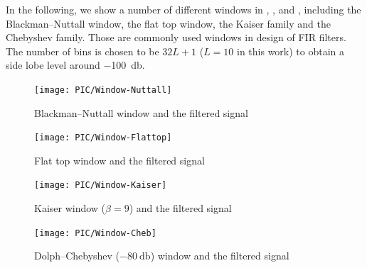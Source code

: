 In the following, we show a number of different windows in , ,  and , including the Blackman--Nuttall window, the flat top window, the Kaiser family and the Chebyshev family. Those are commonly used windows \citep{Oppenheim2010} in design of FIR filters. The number of bins is chosen to be $32L+1$ ($L=10$ in this work) to obtain a side lobe level around \SI{-100}{\decibel}.
\begin{figure}[htb!]
\centering
\texttt{[image: PIC/Window-Nuttall]}
\caption{Blackman--Nuttall window and the filtered signal}\label{fig:nuttall_window}
\end{figure}
\begin{figure}[htb!]
\centering
\texttt{[image: PIC/Window-Flattop]}
\caption{Flat top window and the filtered signal}\label{fig:flattop_window}
\end{figure}
\begin{figure}[htb!]
\centering
\texttt{[image: PIC/Window-Kaiser]}
\caption{Kaiser window ($\beta=9$) and the filtered signal}\label{fig:kaiser_window}
\end{figure}
\begin{figure}[htb!]
\centering
\texttt{[image: PIC/Window-Cheb]}
\caption{Dolph--Chebyshev ($\SI{-80}{\decibel}$) window and the filtered signal}\label{fig:cheb_window}
\end{figure}

